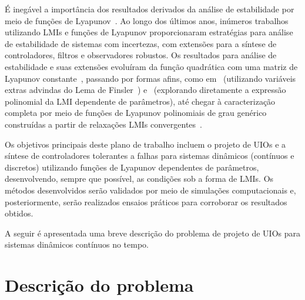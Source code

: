 \documentclass[11pt,a4paper]{article}
\begin{document}
É inegável a importância dos resultados derivados da análise de
estabilidade por meio de funções de Lyapunov~\cite{Lya:92}. Ao longo
dos últimos anos, inúmeros trabalhos utilizando LMIs e funções de
Lyapunov proporcionaram estratégias para análise de estabilidade de
sistemas com incertezas, com extensões para a síntese de
controladores, filtros e observadores robustos. Os resultados para
análise de estabilidade e suas extensões evoluíram da função
quadrática com uma matriz de Lyapunov constante~\cite{BPG:89,GPB:91},
passando por formas afins, como em~\cite{dOBG:99,LP:03,PABB:00}
(utilizando variáveis extras advindas do Lema de
Finsler~\cite{dOS:01}) e~\cite{RP:01a,RP:02} (explorando diretamente a
expressão polinomial da LMI dependente de parâmetros), até chegar à
caracterização completa por meio de funções de Lyapunov polinomiais de
grau genérico construídas a partir de relaxações LMIs
convergentes~\cite{Bli:04a,CGTV:05b,Sch:05,OP:07a,SH:06,OdOP:08,CGTV:09,Che:10}.


Os objetivos principais deste plano de trabalho incluem o projeto de
UIOs e a síntese de controladores tolerantes a falhas para sistemas
dinâmicos (contínuos e discretos) utilizando funções de Lyapunov
dependentes de parâmetros, desenvolvendo, sempre que possível, as
condições sob a forma de LMIs. Os métodos desenvolvidos serão
validados por meio de simulações computacionais e, posteriormente,
serão realizados ensaios práticos para corroborar os resultados
obtidos.

A seguir é apresentada uma breve descrição do problema de projeto de
UIOs para sistemas dinâmicos contínuos no tempo.


\section{Descrição do problema}
\end{document}
